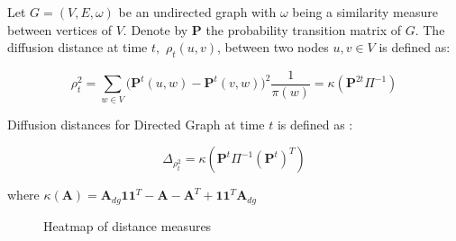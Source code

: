 \documentclass[12pt]{report}
\begin{document}
  Let $G = (V, E, \omega)$ be an undirected graph with $\omega$ being a similarity measure between vertices of $V.$ Denote by $\textbf{P}$ the probability transition matrix of $G.$ The diffusion distance at time $t,$ $\rho_{t}(u,v)$, between two nodes $u,v \in V$ is defined as:
  
  $$\rho^2_{t} = \sum\limits_{w \in V}\big( \textbf{P}^{t}(u,w) - \textbf{P}^{t}(v,w) \big)^2 \frac{1}{\pi(w)} =  \kappa(\textbf{P}^{2t} \Pi^{-1} )$$

 
Diffusion distances for Directed Graph at time $t$ is defined as :

$$\Delta_{\rho^{2}_{t}} = \kappa(\textbf{P}^{t} \Pi^{-1} (\textbf{P}^{t})^{T} )$$
 
where $\kappa(\textbf{A}) = \textbf{A}_{dg} \textbf{1} \textbf{1}^{T} - \textbf{A} - \textbf{A}^{T} + \textbf{1} \textbf{1}^{T} \textbf{A}_{dg}$ 
 
 
\begin{figure}[H]
\captionsetup{format=plain}
\centering
{}
\caption{Heatmap of distance measures}
\label{fig:dist}    
\end{figure} 
 
\end{document}
